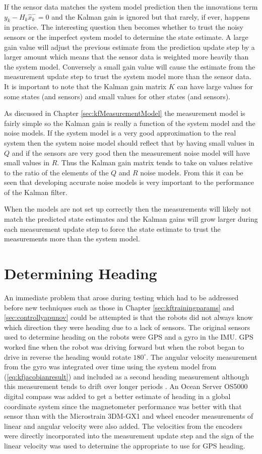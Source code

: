 If the sensor data matches the system model prediction then the innovations term $y_k-H_k\hat{x}_k^-=0$ and the Kalman gain is ignored but that rarely, if ever, happens in practice. The interesting question then becomes whether to trust the noisy sensors or the imperfect system model to determine the state estimate. A large gain value will adjust the previous estimate from the prediction update step by a larger amount which means that the sensor data is weighted more heavily than the system model. Conversely a small gain value will cause the estimate from the measurement update step to trust the system model more than the sensor data. It is important to note that the Kalman gain matrix $K$ can have large values for some states (and sensors) and small values for other states (and sensors).

As discussed in Chapter \ref{sec:kfMeasurementModel} the measurement model is fairly simple so the Kalman gain is really a function of the system model and the noise models. If the system model is a very good approximation to the real system then the system noise model should reflect that by having small values in $Q$ and if the sensors are very good then the measurement noise model will have small values in $R$. Thus the Kalman gain matrix tends to take on values relative to the ratio of the elements of the $Q$ and $R$ noise models. From this it can be seen that developing accurate noise models is very important to the performance of the Kalman filter.

When the models are not set up correctly then the measurements will likely not match the predicted state estimates and the Kalman gains will grow larger during each measurement update step to force the state estimate to trust the measurements more than the system model.

\section{Determining Heading}
\label{sec:determineHeading}
An immediate problem that arose during testing which had to be addressed before new techniques such as those in Chapter \ref{sec:kftrainingparams} and \ref{sec:controllyapunov} could be attempted is that the robots did not always know which direction they were heading due to a lack of sensors. The original sensors used to determine heading on the robots were GPS and a gyro in the IMU. GPS worked fine when the robot was driving forward but when the robot began to drive in reverse the heading would rotate $180^\circ$. The angular velocity measurement from the gyro was integrated over time using the system model from (\ref{eq:kfjacobianresult}) and included as a second heading measurement although this measurement tends to drift over longer periods \cite{ChungOjeda01}. An Ocean Server OS5000 digital compass was added to get a better estimate of heading in a global coordinate system since the magnetometer performance was better with that sensor than with the Microstrain 3DM-GX1 and wheel encoder measurements of linear and angular velocity were also added. The velocities from the encoders were directly incorporated into the measurement update step and the sign of the linear velocity was used to determine the appropriate to use for GPS heading.

